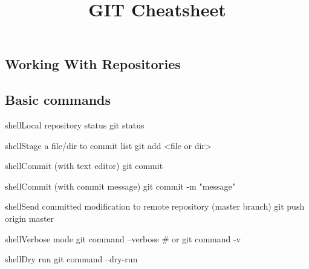 \documentclass[10pt,a4paper]{article}
\title{\color{w3schools}GIT Cheatsheet
}
\begin{document}
\maketitle

\small
\begin{multicols}{3}

\thispagestyle{empty}
\scriptsize



\section{Working With Repositories}

\subsection{Basic commands}

\begin{codebox}{shell}{Local repository status}
git status

\end{codebox}

\begin{codebox}{shell}{Stage a file/dir to commit list}
git add <file or dir>

\end{codebox}

\begin{codebox}{shell}{Commit (with text editor)}
git commit

\end{codebox}

\begin{codebox}{shell}{Commit (with commit message)}
git commit -m "message"

\end{codebox}

\begin{codebox}{shell}{Send committed modification to remote repository (master branch)}
git push origin master

\end{codebox}

\begin{codebox}{shell}{Verbose mode}
git command --verbose
# or 
git command -v

\end{codebox}

\begin{codebox}{shell}{Dry run}
git command --dry-run

\end{codebox}


\end{multicols}
\end{document}
